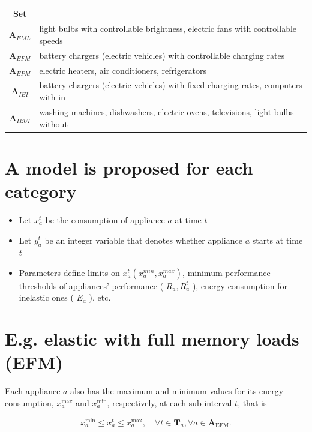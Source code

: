 \documentclass[10pt]{article}
\begin{document}
\begin{center}
\begin{tabular}{|c|l}
\hline
Set &  \\
\hline
$\boldsymbol{A}_{E M L}$ & light bulbs with controllable brightness, electric fans with controllable speeds \\
\hline
$\boldsymbol{A}_{E F M}$ & battery chargers (electric vehicles) with controllable charging rates \\
\hline
$\boldsymbol{A}_{E P M}$ & electric heaters, air conditioners, refrigerators \\
\hline
$\boldsymbol{A}_{I E I}$ & battery chargers (electric vehicles) with fixed charging rates, computers with in \\
\hline
$\boldsymbol{A}_{I E U I}$ & washing machines, dishwashers, electric ovens, televisions, light bulbs without \\
\hline
\end{tabular}
\end{center}

\section*{A model is proposed for each category}
\begin{itemize}
  \item Let $x_{a}^{t}$ be the consumption of appliance $a$ at time $t$
  \item Let $y_{a}^{t}$ be an integer variable that denotes whether appliance $a$ starts at time $t$
  \item Parameters define limits on $x_{a}^{t}\left(x_{a}^{m i n}, x_{a}^{m a x}\right)$, minimum performance thresholds of appliances' performance ( $R_{a}, R_{a}^{t}$ ), energy consumption for inelastic ones ( $E_{a}$ ), etc.
\end{itemize}

\section*{E.g. elastic with full memory loads (EFM)}
Each appliance $a$ also has the maximum and minimum values for its energy consumption, $x_{a}^{\max }$ and $x_{a}^{\min }$, respectively, at each sub-interval $t$, that is


\begin{equation*}
x_{a}^{\min } \leq x_{a}^{t} \leq x_{a}^{\max }, \quad \forall t \in \boldsymbol{T}_{a}, \forall a \in \boldsymbol{A}_{\mathrm{EFM}} . \tag{10}
\end{equation*}
\end{document}
